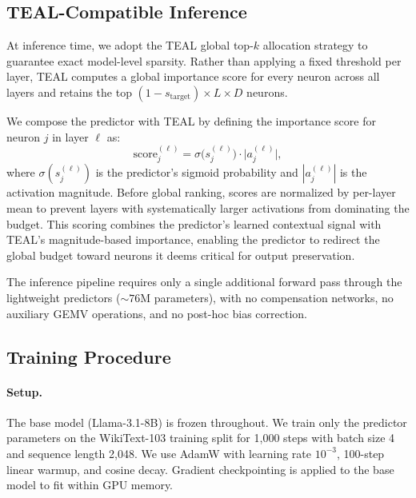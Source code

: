\subsection{TEAL-Compatible Inference}
\label{sec:method:teal}

At inference time, we adopt the TEAL global top-$k$ allocation strategy \cite{placeholder_teal} to guarantee exact model-level sparsity.
Rather than applying a fixed threshold per layer, TEAL computes a global importance score for every neuron across all layers and retains the top $(1{-}s_{\text{target}}) \times L \times D$ neurons.

We compose the predictor with TEAL by defining the importance score for neuron $j$ in layer $\ell$ as:
\begin{equation}
\text{score}_j^{(\ell)} = \sigma\bigl(s_j^{(\ell)}\bigr) \cdot \bigl|a_j^{(\ell)}\bigr|,
\label{eq:teal_score}
\end{equation}
where $\sigma(s_j^{(\ell)})$ is the predictor's sigmoid probability and $|a_j^{(\ell)}|$ is the activation magnitude.
Before global ranking, scores are normalized by per-layer mean to prevent layers with systematically larger activations from dominating the budget.
This scoring combines the predictor's learned contextual signal with TEAL's magnitude-based importance, enabling the predictor to redirect the global budget toward neurons it deems critical for output preservation.

The inference pipeline requires only a single additional forward pass through the lightweight predictors (${\sim}76$M parameters), with no compensation networks, no auxiliary GEMV operations, and no post-hoc bias correction.

\subsection{Training Procedure}
\label{sec:method:training}

\paragraph{Setup.}
The base model (Llama-3.1-8B) is frozen throughout.
We train only the predictor parameters on the WikiText-103 training split for 1{,}000 steps with batch size 4 and sequence length 2{,}048.
We use AdamW \cite{placeholder_adamw} with learning rate $10^{-3}$, 100-step linear warmup, and cosine decay.
Gradient checkpointing is applied to the base model to fit within GPU memory.

